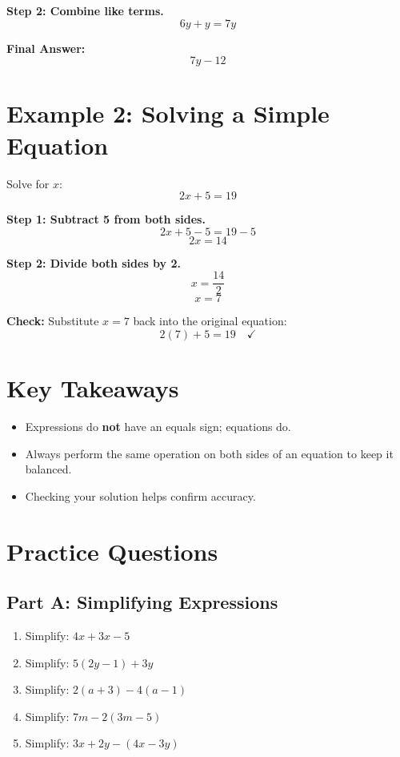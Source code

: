\documentclass[14pt]{extarticle}
\renewcommand{\emph}[1]{\textbf{#1}}
\begin{document}
\textbf{Step 2: Combine like terms.}
\[
6y + y = 7y
\]

\textbf{Final Answer:}
\[
\boxed{7y - 12}
\]

\section*{Example 2: Solving a Simple Equation}

Solve for \(x\):
\[
2x + 5 = 19
\]

\textbf{Step 1: Subtract 5 from both sides.}
\[
2x + 5 - 5 = 19 - 5
\]
\[
2x = 14
\]

\textbf{Step 2: Divide both sides by 2.}
\[
x = \frac{14}{2}
\]
\[
\boxed{x = 7}
\]

\textbf{Check:}
Substitute \(x = 7\) back into the original equation:
\[
2(7) + 5 = 19 \quad \checkmark
\]

\section*{Key Takeaways}
\begin{itemize}
    \item Expressions do \emph{not} have an equals sign; equations do.
    \item Always perform the same operation on both sides of an equation to keep it balanced.
    \item Checking your solution helps confirm accuracy.
\end{itemize}

\newpage


\section*{Practice Questions}

\subsection*{Part A: Simplifying Expressions}
\begin{enumerate}
    \item Simplify: \(4x + 3x - 5\)
    \item Simplify: \(5(2y - 1) + 3y\)
    \item Simplify: \(2(a + 3) - 4(a - 1)\)
    \item Simplify: \(7m - 2(3m - 5)\)
    \item Simplify: \(3x + 2y - (4x - 3y)\)
\end{enumerate}
\end{document}
